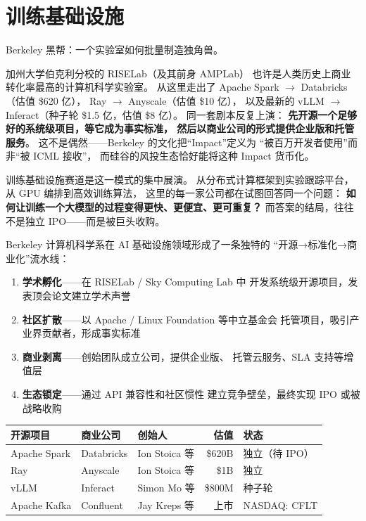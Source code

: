 
\section{训练基础设施}
\label{sec:infra-training}

Berkeley 黑帮：一个实验室如何批量制造独角兽。

加州大学伯克利分校的 RISELab（及其前身 AMPLab）
也许是人类历史上商业转化率最高的计算机科学实验室。
从这里走出了 Apache Spark $\to$ Databricks（估值 \$620 亿），
Ray $\to$ Anyscale（估值 \$10 亿），
以及最新的 vLLM $\to$ Inferact（种子轮 \$1.5 亿，估值 \$8 亿）。
同一套剧本反复上演：
\textbf{先开源一个足够好的系统级项目，等它成为事实标准，
然后以商业公司的形式提供企业版和托管服务}。
这不是偶然——Berkeley 的文化把``Impact''定义为
``被百万开发者使用''而非``被 ICML 接收''，
而硅谷的风投生态恰好能将这种 Impact 货币化。

训练基础设施赛道是这一模式的集中展演。
从分布式计算框架到实验跟踪平台，
从 GPU 编排到高效训练算法，
这里的每一家公司都在试图回答同一个问题：
\textbf{如何让训练一个大模型的过程变得更快、更便宜、更可重复？}
而答案的结局，往往不是独立 IPO——而是被巨头收购。

\begin{corebox}
Berkeley 计算机科学系在 AI 基础设施领域形成了一条独特的
``开源→标准化→商业化''流水线：

\begin{enumerate}[noitemsep]
  \item \textbf{学术孵化}——在 RISELab / Sky Computing Lab 中
        开发系统级开源项目，发表顶会论文建立学术声誉
  \item \textbf{社区扩散}——以 Apache / Linux Foundation 等中立基金会
        托管项目，吸引产业界贡献者，形成事实标准
  \item \textbf{商业剥离}——创始团队成立公司，提供企业版、
        托管云服务、SLA 支持等增值层
  \item \textbf{生态锁定}——通过 API 兼容性和社区惯性
        建立竞争壁垒，最终实现 IPO 或被战略收购
\end{enumerate}

\medskip
\small
\begin{tabularx}{\textwidth}{@{}l l l r l@{}}
\toprule
\rowcolor{figLightGray}
\textbf{开源项目} & \textbf{商业公司} & \textbf{创始人} &
  \textbf{估值} & \textbf{状态} \\
\midrule
Apache Spark  & Databricks   & Ion Stoica 等  & \$620B & 独立（待 IPO）\\
Ray           & Anyscale     & Ion Stoica 等  & \$1B   & 独立 \\
vLLM          & Inferact     & Simon Mo 等    & \$800M & 种子轮 \\
Apache Kafka  & Confluent    & Jay Kreps 等   & 上市   & NASDAQ: CFLT \\
\bottomrule
\end{tabularx}
\end{corebox}


